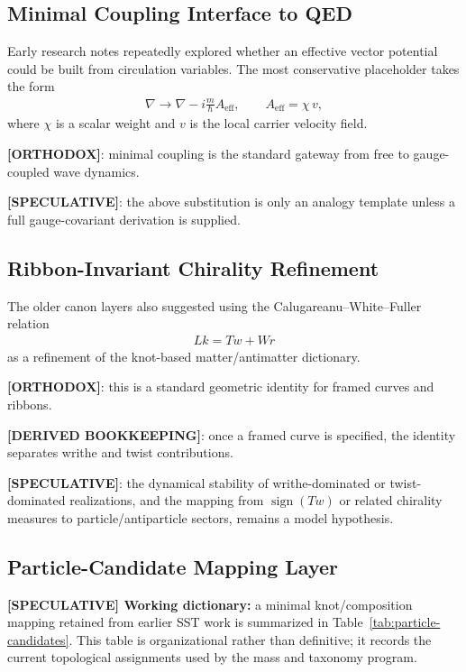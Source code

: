 \subsection{Minimal Coupling Interface to QED}
Early research notes repeatedly explored whether an effective vector potential could be built from circulation variables. The most conservative placeholder takes the form
\begin{align}
    \nabla \rightarrow \nabla - i\frac{m}{\hbar}A_{\mathrm{eff}},
    \qquad
    A_{\mathrm{eff}} = \chi \, v,
\end{align}
where $\chi$ is a scalar weight and $v$ is the local carrier velocity field.

\textbf{[ORTHODOX]}: minimal coupling is the standard gateway from free to gauge-coupled wave dynamics.

\textbf{[SPECULATIVE]}: the above substitution is only an analogy template unless a full gauge-covariant derivation is supplied.

\subsection{Ribbon-Invariant Chirality Refinement}
The older canon layers also suggested using the Calugareanu--White--Fuller relation
\begin{align}
    Lk = Tw + Wr
\end{align}
as a refinement of the knot-based matter/antimatter dictionary.

\textbf{[ORTHODOX]}: this is a standard geometric identity for framed curves and ribbons.

\textbf{[DERIVED BOOKKEEPING]}: once a framed curve is specified, the identity separates writhe and twist contributions.

\textbf{[SPECULATIVE]}: the dynamical stability of writhe-dominated or twist-dominated realizations, and the mapping from $\operatorname{sign}(Tw)$ or related chirality measures to particle/antiparticle sectors, remains a model hypothesis.

\subsection{Particle-Candidate Mapping Layer}
\textbf{[SPECULATIVE] Working dictionary:} a minimal knot/composition mapping retained from earlier SST work is summarized in Table~\ref{tab:particle-candidates}. This table is organizational rather than definitive; it records the current topological assignments used by the mass and taxonomy program.


